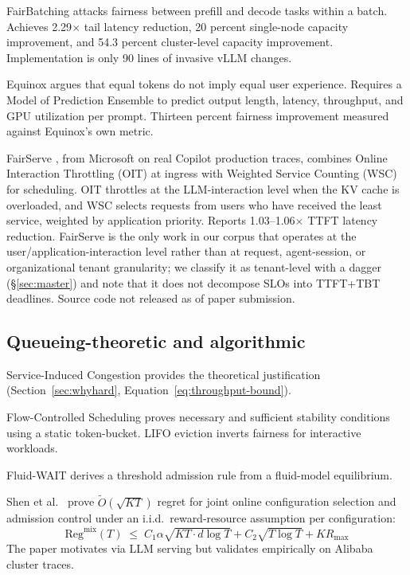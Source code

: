 \documentclass[10pt]{article} %
\theoremstyle{definition}
\begin{document}
FairBatching \citep{lyu2025fairbatching} attacks fairness between
prefill and decode tasks within a batch. Achieves 2.29$\times$ tail
latency reduction, 20 percent single-node capacity improvement, and
54.3 percent cluster-level capacity improvement. Implementation is
only 90 lines of invasive vLLM changes.

Equinox \citep{lu2025equinox} argues that equal tokens do not imply
equal user experience. Requires a Model of Prediction Ensemble to
predict output length, latency, throughput, and GPU utilization per
prompt. Thirteen percent fairness improvement measured against
Equinox's own metric.

FairServe \citep{khan2024fairserve}, from Microsoft on real Copilot
production traces, combines Online Interaction Throttling (OIT) at
ingress with Weighted Service Counting (WSC) for scheduling. OIT
throttles at the LLM-interaction level when the KV cache is
overloaded, and WSC selects requests from users who have received
the least service, weighted by application priority. Reports
1.03--1.06$\times$ TTFT latency reduction. FairServe is the only
work in our corpus that operates at the user/application-interaction
level rather than at request, agent-session, or organizational
tenant granularity; we classify it as tenant-level with a dagger
(\S\ref{sec:master}) and note that it does not decompose SLOs into
TTFT+TBT deadlines. Source code not released as of paper
submission.

\subsection{Queueing-theoretic and algorithmic}

Service-Induced Congestion \citep{ao2026sic} provides the theoretical
justification (Section~\ref{sec:whyhard},
Equation~\ref{eq:throughput-bound}).

Flow-Controlled Scheduling \citep{dong2026flowcontrolled} proves
necessary and sufficient stability conditions using a static
token-bucket. LIFO eviction inverts fairness for interactive
workloads.

Fluid-WAIT \citep{ao2025fluidwait} derives a threshold admission rule
from a fluid-model equilibrium.

Shen et al.\ \citep{shen2026twolayer} prove $\tilde{O}(\sqrt{K T})$
regret for joint online configuration selection and admission control
under an i.i.d.\ reward-resource assumption per configuration:
%
\begin{equation}
\text{Reg}^{\text{mix}}(T) \;\le\; C_1 \alpha \sqrt{K T \cdot d \log T} + C_2 \sqrt{T \log T} + K R_{\max}
\label{eq:shen-regret}
\end{equation}
%
The paper motivates via LLM serving but validates empirically on
Alibaba cluster traces.
\end{document}
